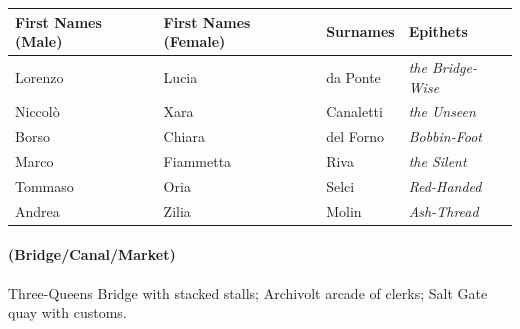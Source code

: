 \begin{longtable}{|p{}|p{}|p{}|p{}|}
\hline
\textbf{First Names (Male)} & \textbf{First Names (Female)} & \textbf{Surnames} & \textbf{Epithets} \\
\hline
Lorenzo & Lucia & da Ponte & \textit{the Bridge-Wise} \\
\hline
Niccol\`{o} & Xara & Canaletti & \textit{the Unseen} \\
\hline
Borso & Chiara & del Forno & \textit{Bobbin-Foot} \\
\hline
Marco & Fiammetta & Riva & \textit{the Silent} \\
\hline
Tommaso & Oria & Selci & \textit{Red-Handed} \\
\hline
Andrea & Zilia & Molin & \textit{Ash-Thread} \\
\hline
\end{longtable}

\paragraph*{(Bridge/Canal/Market)} Three-Queens Bridge with stacked stalls; Archivolt arcade of clerks; Salt Gate quay with customs.

